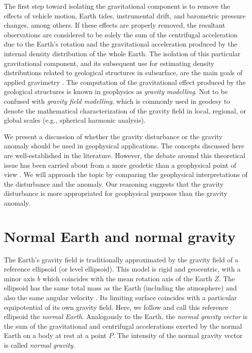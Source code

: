 \documentclass[extra]{gji}
\begin{document}
The first step toward isolating the gravitational component
is to remove the effects of vehicle motion, Earth tides, instrumental drift,
and barometric pressure changes, among others.
If these effects are properly removed,
the resultant observations are considered to be solely
the sum of the centrifugal acceleration due to the Earth's rotation and
the gravitational acceleration produced by
the internal density distribution of the whole Earth.
The isolation of this particular gravitational component,
and its subsequent use for estimating density
distributions related to geological structures in subsurface,
are the main goals of applied gravimetry \citep{blakely1996}.
The computation of the gravitational effect produced by
the geological structures is known in geophysics as
\textit{gravity modelling}.
Not to be confused with \textit{gravity field modelling}, which
is commonly used in geodesy to denote the mathematical characterization of the
gravity field in local, regional, or global scales (e.g., spherical harmonic
analysis).

We present a discussion of whether the gravity disturbance or the gravity
anomaly should be used in geophysical applications.
The concepts discussed here are well-established in the literature.
However, the debate around this theoretical issue has been
carried about from a more geodetic than a geophysical point of view
\citep{lafehr1991,chapin1996,li2001,fairhead2003,
hackney-featherstone2003,hinze2005}.
We will approach the topic by comparing the geophysical interpretations of the
disturbance and the anomaly.
Our reasoning suggests that the gravity disturbance is more appropriated for
geophysical purposes than the gravity anomaly.


\section{Normal Earth and normal gravity}

The Earth's gravity field is traditionally approximated
by the gravity field of a reference ellipsoid (or level ellipsoid).
This model is rigid and geocentric,
with a minor axis $b$ which coincides with
the mean rotation axis of the Earth $Z$.
The ellipsoid has the same total mass as the Earth (including the atmosphere)
and also the same angular velocity \citep{heiskanen-moritz1967,
vanicek1987,hofmann-wellenhof-moritz2005,torge2012}.
Its limiting surface coincides with
a particular equipotential of its own gravity field.
Here, we follow \citep{torge2012} and call this reference ellipsoid
the \textit{normal Earth}.
Analogously to the Earth, the \textit{normal gravity vector} is
the sum of the
gravitational and centrifugal accelerations exerted by the normal
Earth on a body at rest at a point $P$.
The intensity of the normal gravity vector is called \textit{normal gravity}.
\end{document}
